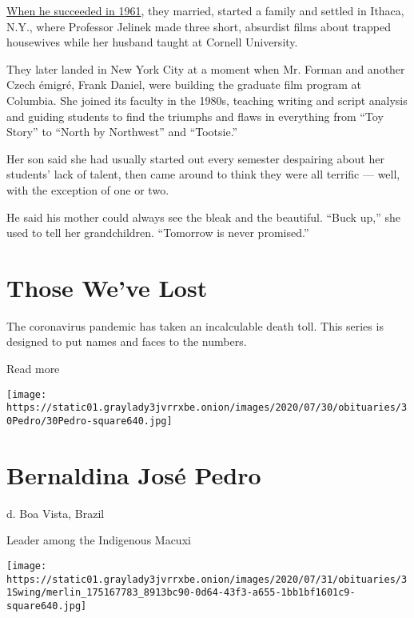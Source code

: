 \href{https://www.nytimes3xbfgragh.onion/1989/12/31/nyregion/czech-couple-keep-eye-on-homeland.html}{When
he succeeded in 1961}, they married, started a family and settled in
Ithaca, N.Y., where Professor Jelinek made three short, absurdist films
about trapped housewives while her husband taught at Cornell University.

They later landed in New York City at a moment when Mr. Forman and
another Czech émigré, Frank Daniel, were building the graduate film
program at Columbia. She joined its faculty in the 1980s, teaching
writing and script analysis and guiding students to find the triumphs
and flaws in everything from ``Toy Story'' to ``North by Northwest'' and
``Tootsie.''

Her son said she had usually started out every semester despairing about
her students' lack of talent, then came around to think they were all
terrific --- well, with the exception of one or two.

He said his mother could always see the bleak and the beautiful. ``Buck
up,'' she used to tell her grandchildren. ``Tomorrow is never
promised.''

\href{https://www.nytimes3xbfgragh.onion/interactive/2020/obituaries/people-died-coronavirus-obituaries.html?action=click\&pgtype=Article\&state=default\&region=BELOW_MAIN_CONTENT\&context=covid_obits_promo}{}

\hypertarget{those-weve-lost}{%
\section{Those We've Lost}\label{those-weve-lost}}

The coronavirus pandemic has taken an incalculable death toll. This
series is designed to put names and faces to the numbers.

Read more

\texttt{[image: https://static01.graylady3jvrrxbe.onion/images/2020/07/30/obituaries/30Pedro/30Pedro-square640.jpg]}

\hypertarget{bernaldina-josuxe9-pedro}{%
\section{Bernaldina José Pedro}\label{bernaldina-josuxe9-pedro}}

d. Boa Vista, Brazil

Leader among the Indigenous Macuxi

\texttt{[image: https://static01.graylady3jvrrxbe.onion/images/2020/07/31/obituaries/31Swing/merlin\_175167783\_8913bc90-0d64-43f3-a655-1bb1bf1601c9-square640.jpg]}


